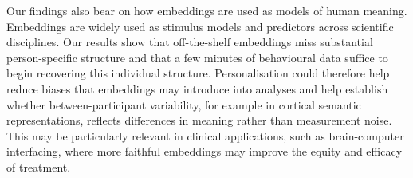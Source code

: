 \documentclass[pdflatex,sn-mathphys]{sn-jnl}
\begin{document}
Our findings also bear on how embeddings are used as models of human meaning. Embeddings are widely used as stimulus models and predictors across scientific disciplines\cite{Goldstein2024,Xu2026,Caliskan2017,Wulff2025,Lee2025,Huth2016,Karpukhin2020}. Our results show that off-the-shelf embeddings miss substantial person-specific structure and that a few minutes of behavioural data suffice to begin recovering this individual structure. Personalisation could therefore help reduce biases that embeddings may introduce into analyses\cite{Bender2021,Atari2023,Paullada2021} and help establish whether between-participant variability, for example in cortical semantic representations\cite{Grand2022,Hebart2020,Huth2016}, reflects differences in meaning rather than measurement noise. This may be particularly relevant in clinical applications, such as brain-computer interfacing\cite{Tang2023,Tang2025,King2025}, where more faithful embeddings may improve the equity and efficacy of treatment.
\end{document}

